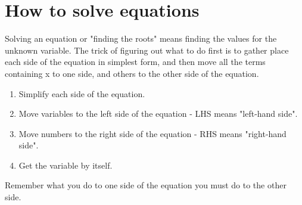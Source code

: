 \documentclass[12pt,letterpaper]{article}
\begin{document}
\section*{How to solve equations}
\begin{large}

Solving an equation or "finding the roots" means finding the values for the unknown variable.
The trick of figuring out what to do first is to gather place each side of the equation
in simplest form, and then move all the terms containing x to one side, and others to 
the other side of the equation.

\begin{enumerate}
	\item Simplify each side of the equation.
	\item Move variables to the left side of the equation - LHS means "left-hand side".
	\item Move numbers to the right side of the equation - RHS means "right-hand side".
	\item Get the variable by itself.
\end{enumerate}

\noindent Remember what you do to one side of the equation you must do to the other side.
\end{large}

\pagebreak
\end{document}
